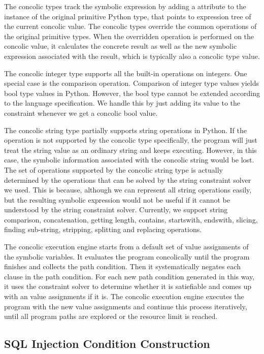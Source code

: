 \documentclass[conference]{IEEEtran}
\begin{document}
The concolic types track the symbolic expression by adding a attribute to the instance of the original primitive Python type, that points to expression tree of the current concolic value. The concolic types override the common operations of the original primitive types. When the overridden operation is performed on the concolic value, it calculates the concrete result as well as the new symbolic expression associated with the result, which is typically also a concolic type value.

The concolic integer type supports all the built-in operations on integers. One special case is the comparison operation. Comparison of integer type values yields bool type values in Python. However, the bool type cannot be extended according to the language specification. We handle this by just adding its value to the constraint whenever we get a concolic bool value.

The concolic string type partially supports string operations in Python. If the operation is not supported by the concolic type specifically, the program will just treat the string value as an ordinary string and keeps executing. However, in this case, the symbolic information associated with the concolic string would be lost. The set of operations supported by the concolic string type is actually determined by the operations that can be solved by the string constraint solver we used. This is because, although we can represent all string operations easily, but the resulting symbolic expression would not be useful if it cannot be understood by the string constraint solver. Currently, we support string comparison, concatenation, getting length, contains, startswith, endswith, slicing, finding sub-string, stripping, splitting and replacing operations.

The concolic execution engine starts from a default set of value assignments of the symbolic variables. It evaluates the program concolically until the program finishes and collects the path condition. Then it systematically negates each clause in the path condition. For each new path condition generated in this way, it uses the constraint solver to determine whether it is satiefiable and comes up with an value assignments if it is. The concolic execution engine executes the program with the new value assignments and continue this process iteratively, until all program paths are explored or the resource limit is reached.

\subsection{SQL Injection Condition Construction}
\end{document}
